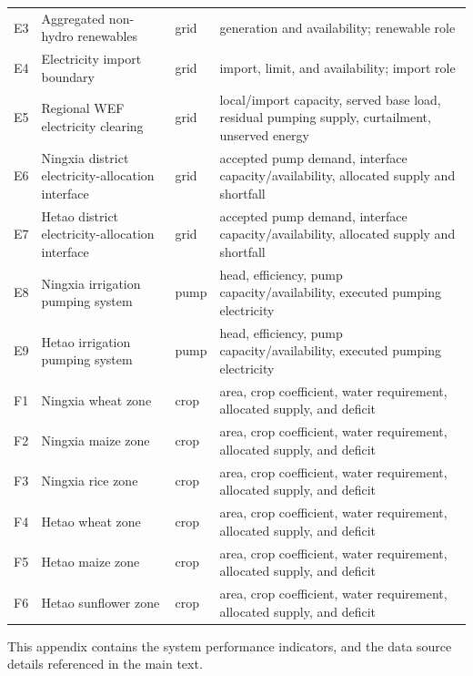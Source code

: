 \documentclass [a4paper,fleqn] {cas-dc}
\begin{document}
\begin{table}[t]
\begin{tabularx}{\textwidth}{@{}l >{\raggedright\arraybackslash}p{} l
  >{\raggedright\arraybackslash}X@{}}
E3 & Aggregated non-hydro renewables & grid & generation and availability; renewable role \\
E4 & Electricity import boundary & grid & import, limit, and availability; import role \\
E5 & Regional WEF electricity clearing & grid & local/import capacity, served base load, residual pumping supply, curtailment, unserved energy \\
E6 & Ningxia district electricity-allocation interface & grid & accepted pump demand, interface capacity/availability, allocated supply and shortfall \\
E7 & Hetao district electricity-allocation interface & grid & accepted pump demand, interface capacity/availability, allocated supply and shortfall \\
E8 & Ningxia irrigation pumping system & pump & head, efficiency, pump capacity/availability, executed pumping electricity \\
E9 & Hetao irrigation pumping system & pump & head, efficiency, pump capacity/availability, executed pumping electricity \\
\midrule
F1 & Ningxia wheat zone & crop & area, crop coefficient, water requirement, allocated supply, and deficit \\
F2 & Ningxia maize zone & crop & area, crop coefficient, water requirement, allocated supply, and deficit \\
F3 & Ningxia rice zone & crop & area, crop coefficient, water requirement, allocated supply, and deficit \\
F4 & Hetao wheat zone & crop & area, crop coefficient, water requirement, allocated supply, and deficit \\
F5 & Hetao maize zone & crop & area, crop coefficient, water requirement, allocated supply, and deficit \\
F6 & Hetao sunflower zone & crop & area, crop coefficient, water requirement, allocated supply, and deficit \\
\bottomrule
\end{tabularx}
\end{table}
\FloatBarrier


This appendix contains the system performance indicators, and the data source details referenced in the main text.

\end{document}
